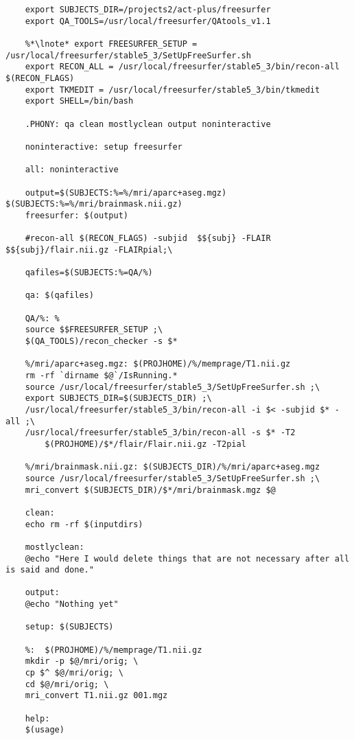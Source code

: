 \begin{lstlisting}
	export SUBJECTS_DIR=/projects2/act-plus/freesurfer
	export QA_TOOLS=/usr/local/freesurfer/QAtools_v1.1
	
	%*\lnote* export FREESURFER_SETUP = /usr/local/freesurfer/stable5_3/SetUpFreeSurfer.sh
	export RECON_ALL = /usr/local/freesurfer/stable5_3/bin/recon-all $(RECON_FLAGS)
	export TKMEDIT = /usr/local/freesurfer/stable5_3/bin/tkmedit	
	export SHELL=/bin/bash
	
	.PHONY: qa clean mostlyclean output noninteractive 
	
	noninteractive: setup freesurfer
	
	all: noninteractive
	
	output=$(SUBJECTS:%=%/mri/aparc+aseg.mgz) $(SUBJECTS:%=%/mri/brainmask.nii.gz)
	freesurfer: $(output)
	
	#recon-all $(RECON_FLAGS) -subjid  $${subj} -FLAIR $${subj}/flair.nii.gz -FLAIRpial;\
		
	qafiles=$(SUBJECTS:%=QA/%)
	
	qa: $(qafiles)
	
	QA/%: %
	source $$FREESURFER_SETUP ;\
	$(QA_TOOLS)/recon_checker -s $*
		
	%/mri/aparc+aseg.mgz: $(PROJHOME)/%/memprage/T1.nii.gz
	rm -rf `dirname $@`/IsRunning.*
	source /usr/local/freesurfer/stable5_3/SetUpFreeSurfer.sh ;\
	export SUBJECTS_DIR=$(SUBJECTS_DIR) ;\
	/usr/local/freesurfer/stable5_3/bin/recon-all -i $< -subjid $* -all ;\
	/usr/local/freesurfer/stable5_3/bin/recon-all -s $* -T2 
		$(PROJHOME)/$*/flair/Flair.nii.gz -T2pial
		
	%/mri/brainmask.nii.gz: $(SUBJECTS_DIR)/%/mri/aparc+aseg.mgz
	source /usr/local/freesurfer/stable5_3/SetUpFreeSurfer.sh ;\
	mri_convert $(SUBJECTS_DIR)/$*/mri/brainmask.mgz $@
	
	clean:
	echo rm -rf $(inputdirs)
	
	mostlyclean:
	@echo "Here I would delete things that are not necessary after all is said and done."
	
	output: 
	@echo "Nothing yet"
	
	setup: $(SUBJECTS)
	
	%:  $(PROJHOME)/%/memprage/T1.nii.gz 
	mkdir -p $@/mri/orig; \
	cp $^ $@/mri/orig; \
	cd $@/mri/orig; \
	mri_convert T1.nii.gz 001.mgz
	
	help:
	$(usage)
\end{lstlisting}
